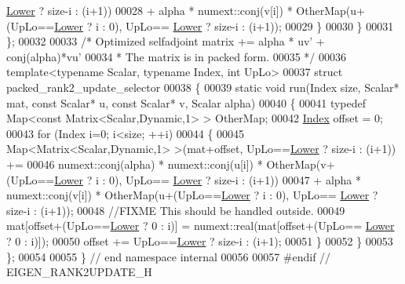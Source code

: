 \begin{DoxyCode}
      \hyperlink{group__enums_gga39e3366ff5554d731e7dc8bb642f83cda891792b8ed394f7607ab16dd716f60e6}{Lower} ? size-i : (i+1))
00028                 + alpha * numext::conj(v[i]) * OtherMap(u+(UpLo==\hyperlink{group__enums_gga39e3366ff5554d731e7dc8bb642f83cda891792b8ed394f7607ab16dd716f60e6}{Lower} ? i : 0), UpLo==
      \hyperlink{group__enums_gga39e3366ff5554d731e7dc8bb642f83cda891792b8ed394f7607ab16dd716f60e6}{Lower} ? size-i : (i+1));
00029     \}
00030   \}
00031 \};
00032 
00033 \textcolor{comment}{/* Optimized selfadjoint matrix += alpha * uv' + conj(alpha)*vu'}
00034 \textcolor{comment}{ * The matrix is in packed form.}
00035 \textcolor{comment}{ */}
00036 \textcolor{keyword}{template}<\textcolor{keyword}{typename} Scalar, \textcolor{keyword}{typename} Index, \textcolor{keywordtype}{int} UpLo>
00037 \textcolor{keyword}{struct }packed\_rank2\_update\_selector
00038 \{
00039   \textcolor{keyword}{static} \textcolor{keywordtype}{void} run(Index size, Scalar* mat, \textcolor{keyword}{const} Scalar* u, \textcolor{keyword}{const} Scalar* v, Scalar alpha)
00040   \{
00041     \textcolor{keyword}{typedef} Map<const Matrix<Scalar,Dynamic,1> > OtherMap;
00042     \hyperlink{namespace_eigen_a62e77e0933482dafde8fe197d9a2cfde}{Index} offset = 0;
00043     \textcolor{keywordflow}{for} (Index i=0; i<size; ++i)
00044     \{
00045       Map<Matrix<Scalar,Dynamic,1> >(mat+offset, UpLo==\hyperlink{group__enums_gga39e3366ff5554d731e7dc8bb642f83cda891792b8ed394f7607ab16dd716f60e6}{Lower} ? size-i : (i+1)) +=
00046       numext::conj(alpha) * numext::conj(u[i]) * OtherMap(v+(UpLo==\hyperlink{group__enums_gga39e3366ff5554d731e7dc8bb642f83cda891792b8ed394f7607ab16dd716f60e6}{Lower} ? i : 0), UpLo==
      \hyperlink{group__enums_gga39e3366ff5554d731e7dc8bb642f83cda891792b8ed394f7607ab16dd716f60e6}{Lower} ? size-i : (i+1))
00047                 + alpha * numext::conj(v[i]) * OtherMap(u+(UpLo==\hyperlink{group__enums_gga39e3366ff5554d731e7dc8bb642f83cda891792b8ed394f7607ab16dd716f60e6}{Lower} ? i : 0), UpLo==
      \hyperlink{group__enums_gga39e3366ff5554d731e7dc8bb642f83cda891792b8ed394f7607ab16dd716f60e6}{Lower} ? size-i : (i+1));
00048       \textcolor{comment}{//FIXME This should be handled outside.}
00049       mat[offset+(UpLo==\hyperlink{group__enums_gga39e3366ff5554d731e7dc8bb642f83cda891792b8ed394f7607ab16dd716f60e6}{Lower} ? 0 : i)] = numext::real(mat[offset+(UpLo==
      \hyperlink{group__enums_gga39e3366ff5554d731e7dc8bb642f83cda891792b8ed394f7607ab16dd716f60e6}{Lower} ? 0 : i)]);
00050       offset += UpLo==\hyperlink{group__enums_gga39e3366ff5554d731e7dc8bb642f83cda891792b8ed394f7607ab16dd716f60e6}{Lower} ? size-i : (i+1);
00051     \}
00052   \}
00053 \};
00054 
00055 \} \textcolor{comment}{// end namespace internal}
00056 
00057 \textcolor{preprocessor}{#endif // EIGEN\_RANK2UPDATE\_H}
\end{DoxyCode}
